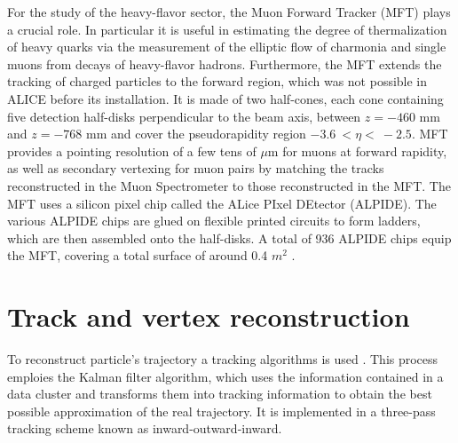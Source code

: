 \documentclass[12pt,a4paper]{book}
\begin{document}
	For the study of the heavy-flavor sector, the Muon Forward Tracker (MFT) plays a crucial role. In particular it is useful in estimating the degree of thermalization of heavy quarks via the measurement of the elliptic flow of charmonia and single muons from decays of heavy-flavor hadrons. Furthermore, the MFT extends the tracking of charged particles to the forward region, which was not possible in ALICE before its installation. It is made of two half-cones, each cone containing five detection half-disks perpendicular to the beam axis, between $z = -460$ mm and $z = -768$ mm and cover the pseudorapidity region $-3.6 \ < \eta < \ -2.5$. MFT provides a pointing resolution of a few tens of $\mu$m for muons at forward rapidity, as well as secondary vertexing for muon pairs by matching the tracks reconstructed in the Muon Spectrometer to those reconstructed in the MFT. The MFT uses a silicon pixel chip called the ALice PIxel DEtector (ALPIDE). The various ALPIDE chips are glued on flexible printed circuits to form ladders, which are then assembled onto the half-disks. A total of 936 ALPIDE chips equip the MFT, covering a total surface of around 0.4 $m^2$ \cite{Herrmann:2920632}.
	
\section{Track and vertex reconstruction} \label{cap:5.3}

To reconstruct particle's trajectory a tracking algorithms is used \cite{Cheng:2908766}.  This process emploies the Kalman filter algorithm, which uses the information contained in a data cluster and transforms them into tracking information to obtain the best possible approximation of the real trajectory. It is implemented in a three-pass tracking scheme known as inward-outward-inward. 
\end{document}
